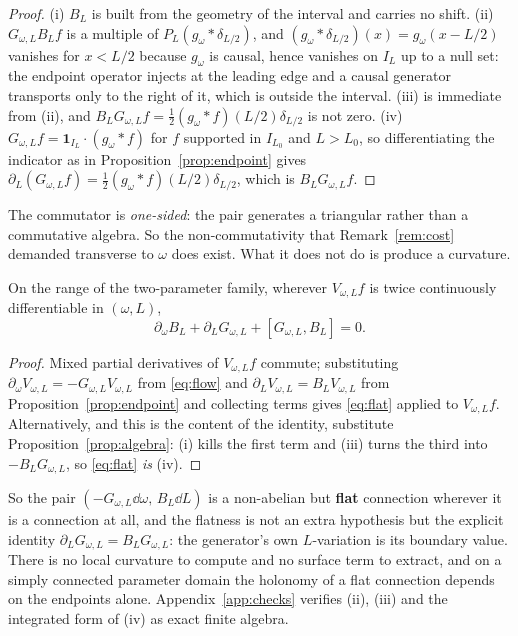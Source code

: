 \begin{proof}
(i) $B_L$ is built from the geometry of the interval and carries no shift.
(ii) $G_{\omega,L}B_Lf$ is a multiple of $P_L(g_\omega*\delta_{L/2})$, and
$(g_\omega*\delta_{L/2})(x)=g_\omega(x-L/2)$ vanishes for $x<L/2$ because
$g_\omega$ is causal, hence vanishes on $I_L$ up to a null set: the endpoint
operator injects at the leading edge and a causal generator transports only to
the right of it, which is outside the interval. (iii) is immediate from (ii),
and $B_LG_{\omega,L}f=\frac12(g_\omega*f)(L/2)\delta_{L/2}$ is not zero.
(iv) $G_{\omega,L}f=\mathbf1_{I_L}\cdot(g_\omega*f)$ for $f$ supported in
$I_{L_0}$ and $L>L_0$, so differentiating the indicator as in
Proposition~\ref{prop:endpoint} gives
$\partial_L(G_{\omega,L}f)=\frac12(g_\omega*f)(L/2)\delta_{L/2}$, which is
$B_LG_{\omega,L}f$.
\end{proof}

The commutator is \emph{one-sided}: the pair generates a triangular rather than a
commutative algebra. So the non-commutativity that Remark~\ref{rem:cost} demanded
transverse to $\omega$ does exist. What it does not do is produce a curvature.

\begin{proposition}[Flatness]\label{prop:flat}
On the range of the two-parameter family, wherever $V_{\omega,L}f$ is twice
continuously differentiable in $(\omega,L)$,
\begin{equation}\label{eq:flat}
 \partial_\omega B_L+\partial_LG_{\omega,L}+[G_{\omega,L},B_L]=0 .
\end{equation}
\end{proposition}

\begin{proof}
Mixed partial derivatives of $V_{\omega,L}f$ commute; substituting
$\partial_\omega V_{\omega,L}=-G_{\omega,L}V_{\omega,L}$ from \eqref{eq:flow} and
$\partial_LV_{\omega,L}=B_LV_{\omega,L}$ from Proposition~\ref{prop:endpoint}
and collecting terms gives \eqref{eq:flat} applied to $V_{\omega,L}f$.
Alternatively, and this is the content of the identity, substitute
Proposition~\ref{prop:algebra}: (i) kills the first term and (iii) turns the
third into $-B_LG_{\omega,L}$, so \eqref{eq:flat} \emph{is} (iv).
\end{proof}

So the pair $(-G_{\omega,L}\dd\omega,\,B_L\dd L)$ is a non-abelian but
\textbf{flat} connection wherever it is a connection at all, and the flatness is
not an extra hypothesis but the explicit identity
$\partial_LG_{\omega,L}=B_LG_{\omega,L}$: the generator's own $L$-variation is its
boundary value. There is no local curvature to compute and no surface term to
extract, and on a simply connected parameter domain the holonomy of a flat
connection depends on the endpoints alone. Appendix~\ref{app:checks} verifies
(ii), (iii) and the integrated form of (iv) as exact finite algebra.

